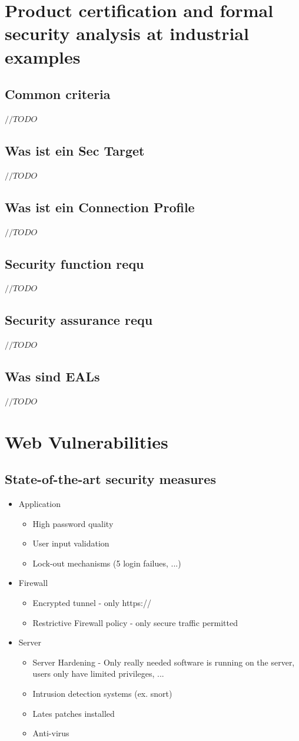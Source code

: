 \documentclass[a4paper, 12pt]{article}
\begin{document}
\section{Product certification and
formal security analysis
at industrial examples}
\subsection{Common criteria}
$ //TODO $
\subsection{Was ist ein Sec Target}
$ //TODO $
\subsection{Was ist ein Connection Profile}
$ //TODO $
\subsection{Security function requ}
$ //TODO $
\subsection{Security assurance requ}
$ //TODO $
\subsection{Was sind EALs}
$ //TODO $

\section{Web Vulnerabilities}
\subsection{State-of-the-art security measures}
\begin{itemize}
	\item Application	
	\begin{itemize}
		\item High password quality
		\item User input validation
		\item Lock-out mechanisms (5 login failues, ...)
	\end{itemize}
	\item Firewall
	\begin{itemize}
		\item Encrypted tunnel - only https://
		\item Restrictive Firewall policy - only secure traffic permitted
	\end{itemize}
	\item Server
	\begin{itemize}
		\item Server Hardening - Only really needed software is running on the server, users only have limited privileges, ...
		\item Intrusion detection systems (ex. snort)
		\item Lates patches installed
		\item Anti-virus
	\end{itemize}
\end{itemize}
\end{document}
